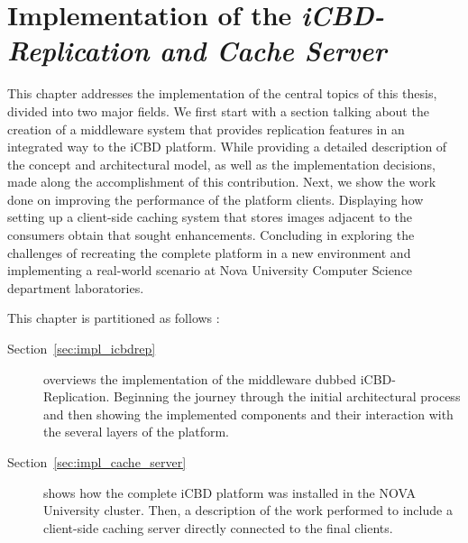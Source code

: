 \chapter{Implementation of the \textit{iCBD-Replication and Cache Server}}
\label{cha:impl_replication_caching}

This chapter addresses the implementation of the central topics of this thesis, divided into two major fields.
We first start with a section talking about the creation of a middleware system that provides replication features in an integrated way to the iCBD platform. While providing a detailed description of the concept and architectural model, as well as the implementation decisions, made along the accomplishment of this contribution.
Next, we show the work done on improving the performance of the platform clients. Displaying how setting up a client-side caching system that stores images adjacent to the consumers obtain that sought enhancements. Concluding in exploring the challenges of recreating the complete platform in a new environment and implementing a real-world scenario at Nova University Computer Science department laboratories.


This chapter is partitioned as follows :

\begin{description}
    \item [Section~\ref{sec:impl_icbdrep}] overviews the implementation of the middleware dubbed iCBD-Replication. Beginning the journey through the initial architectural process and then showing the implemented components and their interaction with the several layers of the platform.
    \item [Section~\ref{sec:impl_cache_server}] shows how the complete iCBD platform was installed in the NOVA University cluster. Then, a description of the work performed to include a client-side caching server directly connected to the final clients.
\end{description}
\newpage

